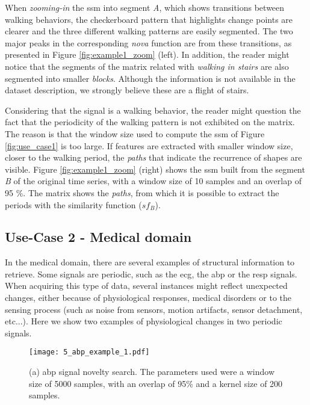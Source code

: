 {When \textit{zooming-in} the \gls{ssm} into segment \textit{A}, which shows transitions between walking behaviors, the checkerboard pattern that highlights change points are clearer and the three different walking patterns are easily segmented. The two major peaks in the corresponding \textit{nova} function are from these transitions, as presented in Figure \ref{fig:example1_zoom} (left). In addition, the reader might notice that the segments of the matrix related with \textit{walking in stairs} are also segmented into smaller \textit{blocks}. Although the information is not available in the dataset description, we strongly believe these are a flight of stairs.
\par
Considering that the signal is a walking behavior, the reader might question the fact that the periodicity of the walking pattern is not exhibited on the matrix. The reason is that the window size used to compute the \gls{ssm} of Figure \ref{fig:use_case1} is too large. If features are extracted with smaller window size, closer to the walking period, the \textit{paths} that indicate the recurrence of shapes are visible. Figure \ref{fig:example1_zoom} (right) shows the \gls{ssm} built from the segment \textit{B} of the original time series, with a window size of 10 samples and an overlap of 95 \%. The matrix shows the \textit{paths}, from which it is possible to extract the periods with the similarity function ($sf_B$).


\subsection{Use-Case 2 - Medical domain}

In the medical domain, there are several examples of structural information to retrieve. Some signals are periodic, such as the \gls{ecg}, the \gls{abp} or the \gls{resp} signals. When acquiring this type of data, several instances might reflect unexpected changes, either because of physiological responses, medical disorders or to the sensing process (such as noise from sensors, motion artifacts, sensor detachment, etc...). Here we show two examples of physiological changes in two periodic signals.

\begin{figure}
    \centering
    \texttt{[image: 5\_abp\_example\_1.pdf]}
    \caption{(a) \gls{abp} signal novelty search. The parameters used were a window size of 5000 samples, with an overlap of 95\% and a kernel size of 200 samples.}
    \label{fig:example2}
\end{figure}

}
